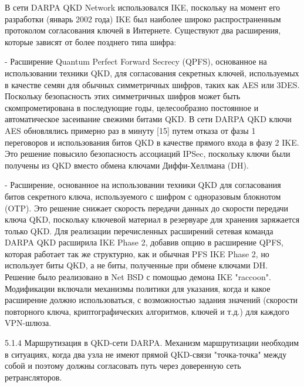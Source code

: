 В сети DARPA QKD Network использовался IKE, поскольку на момент его разработки (январь 2002 года) IKE был наиболее широко распространенным протоколом согласования ключей в Интернете. Существуют два расширения, которые зависят от более позднего типа шифра:

- Расширение Quantum Perfect Forward Secrecy (QPFS), основанное на использовании техники QKD, для согласования секретных ключей, используемых в качестве семян для обычных симметричных шифров, таких как AES или 3DES. Поскольку безопасность этих симметричных шифров может быть скомпрометирована в последующие годы, целесообразно постоянное и автоматическое засеивание свежими битами QKD. В сети DARPA QKD ключи AES обновлялись примерно раз в минуту [15] путем отказа от фазы 1 переговоров и использования битов QKD в качестве прямого входа в фазу 2 IKE. Это решение повысило безопасность ассоциаций IPSec, поскольку ключи были получены из QKD вместо обмена ключами Диффи-Хеллмана (DH).

- Расширение, основанное на использовании техники QKD для согласования битов секретного ключа, используемого с шифром с одноразовым блокнотом (OTP). Это решение снижает скорость передачи данных до скорости передачи ключа QKD, поскольку ключевой материал в резервуаре для хранения заряжается только QKD.
Для реализации перечисленных расширений сетевая команда DARPA QKD расширила IKE Phase 2, добавив опцию в расширение QPFS, которая работает так же структурно, как и обычная PFS IKE Phase 2, но использует биты QKD, а не биты, полученные при обмене ключами DH. Решение было реализовано в Net BSD с помощью демона IKE "raccoon". Модификации включали механизмы политики для указания, когда и какое расширение должно использоваться, с возможностью задания значений (скорости повторного ключа, криптографических алгоритмов, ключей и т.д.) для каждого VPN-шлюза.

5.1.4 Маршрутизация в QKD-сети DARPA. Механизм маршрутизации необходим в ситуациях, когда два узла не имеют прямой QKD-связи "точка-точка" между собой и поэтому должны согласовать путь через доверенную сеть ретрансляторов.

